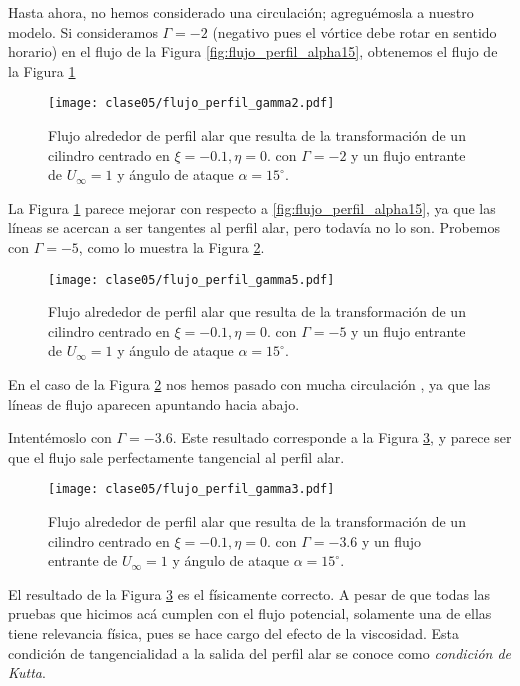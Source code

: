Hasta ahora, no hemos considerado una circulación; agreguémosla a nuestro modelo.
Si consideramos $\Gamma=-2$ (negativo pues el vórtice debe rotar en sentido horario) en el flujo de la Figura \ref{fig:flujo_perfil_alpha15}, obtenemos el flujo de la Figura \ref{fig:flujo_perfil_gamma2}
%
\begin{figure}[h!]
\centering
\texttt{[image: clase05/flujo\_perfil\_gamma2.pdf]}
\caption{Flujo alrededor de perfil alar que resulta de la transformación de un cilindro centrado en $\xi=-0.1, \eta=0.$ con $\Gamma=-2$ y un flujo entrante de $U_\infty=1$ y ángulo de ataque $\alpha=15^\circ$.}\label{fig:flujo_perfil_gamma2}
\end{figure}

La Figura \ref{fig:flujo_perfil_gamma2} parece mejorar con respecto a \ref{fig:flujo_perfil_alpha15}, ya que las líneas se acercan a ser tangentes al perfil alar, pero todavía no lo son.
Probemos con $\Gamma=-5$, como lo muestra la Figura \ref{fig:flujo_perfil_gamma5}.
%
\begin{figure}[h!]
\centering
\texttt{[image: clase05/flujo\_perfil\_gamma5.pdf]}
\caption{Flujo alrededor de perfil alar que resulta de la transformación de un cilindro centrado en $\xi=-0.1, \eta=0.$ con $\Gamma=-5$ y un flujo entrante de $U_\infty=1$ y ángulo de ataque $\alpha=15^\circ$.}\label{fig:flujo_perfil_gamma5}
\end{figure}

En el caso de la Figura \ref{fig:flujo_perfil_gamma5} nos hemos pasado con mucha circulación , ya que las líneas de flujo aparecen apuntando hacia abajo.

Intentémoslo con $\Gamma=-3.6$.
Este resultado corresponde a la Figura \ref{fig:flujo_perfil_gamma3}, y parece ser que el flujo sale perfectamente tangencial al perfil alar.
%
\begin{figure}[h!]
\centering
\texttt{[image: clase05/flujo\_perfil\_gamma3.pdf]}
\caption{Flujo alrededor de perfil alar que resulta de la transformación de un cilindro centrado en $\xi=-0.1, \eta=0.$ con $\Gamma=-3.6$ y un flujo entrante de $U_\infty=1$ y ángulo de ataque $\alpha=15^\circ$.}\label{fig:flujo_perfil_gamma3}
\end{figure}

El resultado de la Figura \ref{fig:flujo_perfil_gamma3} es el físicamente correcto.
A pesar de que todas las pruebas que hicimos acá cumplen con el flujo potencial, solamente una de ellas tiene relevancia física, pues se hace cargo del efecto de la viscosidad.
Esta condición de tangencialidad a la salida del perfil alar se conoce como \emph{condición de Kutta}.

